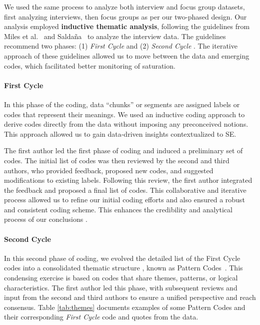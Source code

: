 We used the same process to analyze both interview and focus group datasets, first analyzing interviews, then focus groups as per our two-phased design. Our analysis employed \textbf{inductive thematic analysis}, following the guidelines from Miles et al.~\citep{miles2014qualitative} and Salda{\~n}a~\citep{saldana2021coding} to analyze the interview data. The guidelines recommend two phases: (1) \textit{First Cycle} and (2) \textit{Second Cycle} \citep{miles2014qualitative,saldana2021coding}. The iterative approach of these guidelines allowed us to move between the data and emerging codes, which facilitated better monitoring of saturation.

\paragraph*{First Cycle} In this phase of the coding, data ``chunks'' or segments are assigned labels or codes that represent their meanings. We used an inductive coding approach to derive codes directly from the data without imposing any preconceived notions. This approach allowed us to gain data-driven insights contextualized to SE.

The first author led the first phase of coding and induced a preliminary set of codes. The initial list of codes was then reviewed by the second and third authors, who provided feedback, proposed new codes, and suggested modifications to existing labels. Following this review, the first author integrated the feedback and proposed a final list of codes. This collaborative and iterative process allowed us to refine our initial coding efforts and also ensured a robust and consistent coding scheme. This enhances the credibility and analytical process of our conclusions \citep{miles2014qualitative}.

\paragraph*{Second Cycle} In this second phase of coding, we evolved the detailed list of the First Cycle codes into a consolidated thematic structure \citep{saldana2021coding}, known as Pattern Codes~\citep{miles2014qualitative}. This condensing exercise is based on codes that share themes, patterns, or logical characteristics. The first author led this phase, with subsequent reviews and input from the second and third authors to ensure a unified perspective and reach consensus. Table \ref{tab:themes} documents examples of some Pattern Codes and their corresponding \textit{First Cycle} code and quotes from the data.

